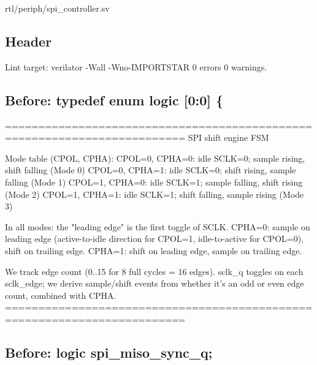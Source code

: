 \begin{relocated}{rtl/periph/spi_controller.sv}

\subsection*{Header}

\begin{textblock}
Lint target: verilator -Wall -Wno-IMPORTSTAR 0 errors 0 warnings.
\end{textblock}

\subsection*{Before: typedef enum logic [0:0] \{}

\begin{textblock}
=========================================================================
SPI shift engine FSM

Mode table (CPOL, CPHA):
  CPOL=0, CPHA=0: idle SCLK=0; sample rising, shift falling  (Mode 0)
  CPOL=0, CPHA=1: idle SCLK=0; shift rising,  sample falling (Mode 1)
  CPOL=1, CPHA=0: idle SCLK=1; sample falling, shift rising  (Mode 2)
  CPOL=1, CPHA=1: idle SCLK=1; shift falling,  sample rising (Mode 3)

In all modes: the "leading edge" is the first toggle of SCLK.
  CPHA=0: sample on leading edge (active-to-idle direction for CPOL=1,
          idle-to-active for CPOL=0), shift on trailing edge.
  CPHA=1: shift on leading edge, sample on trailing edge.

We track edge count (0..15 for 8 full cycles = 16 edges).
sclk_q toggles on each sclk_edge; we derive sample/shift events from
whether it's an odd or even edge count, combined with CPHA.
=========================================================================
\end{textblock}

\subsection*{Before: logic spi\_miso\_sync\_q;}

\end{relocated}

